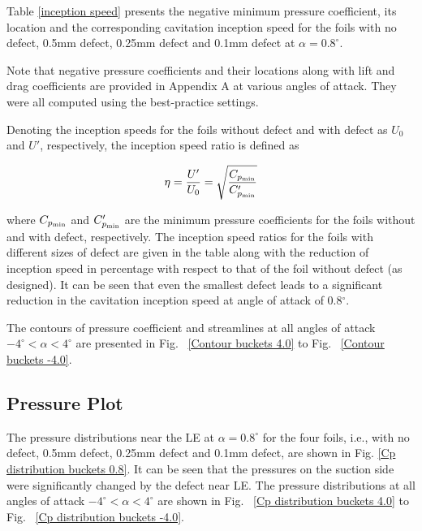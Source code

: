 \documentclass[onecolumn,11pt]{report}
\begin{document}
Table \ref{inception speed} presents the negative minimum pressure coefficient, its location and the corresponding cavitation inception speed for the foils with no defect, 0.5mm defect, 0.25mm defect and 0.1mm defect at $\alpha=0.8^\circ$. 

Note that negative pressure coefficients and their locations along with lift and drag coefficients are provided in Appendix A at various angles of attack. They were all computed using the best-practice settings. 

Denoting the inception speeds for the foils without defect and with defect as $U_0$ and $U'$, respectively, the inception speed ratio is defined as 

\begin{equation}
\eta = \frac{U'}{U_0} = \sqrt{\frac{C_{p_{\rm min}}}{C'_{p_{\rm min}}}}
\end{equation}

where $C_{p_{\rm min}}$ and $C'_{p_{\rm min}}$ are the minimum pressure coefficients for the foils without and with defect, respectively. The inception speed ratios for the foils with different sizes of defect are given in the table along with the reduction of inception speed in percentage with respect to that of the foil without defect (as designed). It can be seen that even the smallest defect leads to a significant reduction in the cavitation inception speed at angle of attack of 0.8$^\circ$. 


The contours of pressure coefficient and streamlines at all angles of attack $-4^\circ < \alpha < 4^\circ$ are presented in Fig. ~\ref{Contour buckets 4.0} to Fig. ~\ref{Contour buckets -4.0}.

%

\subsection{Pressure Plot}

The pressure distributions near the LE at $\alpha=0.8^\circ$ for the four foils, i.e., with no defect, 0.5mm defect, 0.25mm defect and 0.1mm defect, are shown in Fig.  \ref{Cp distribution buckets 0.8}. It can be seen that the pressures on the suction side were significantly changed by the defect near LE. The pressure distributions at all angles of attack $-4^\circ < \alpha < 4^\circ$ are shown in Fig. ~\ref{Cp distribution buckets 4.0} to Fig. ~\ref{Cp distribution buckets -4.0}.
\end{document}
